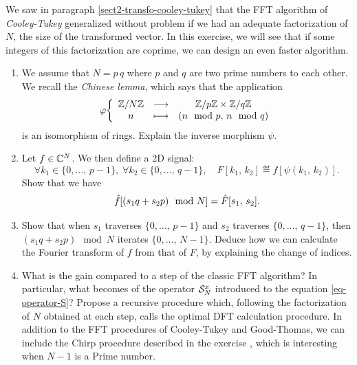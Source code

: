  
\begin{exo}
\label{exo-algo-good-thomas}
 
   We saw in paragraph \ref{sect2-transfo-cooley-tukey} that the FFT algorithm of \textit{Cooley-Tukey} generalized without problem if we had an adequate factorization of $N$, the size of the transformed vector. In this exercise, we will see that if some integers of this factorization are coprime, we can design an even faster algorithm. \begin{enumerate}
\item {}   We assume that $ N = p \, q $ where $ p $ and $ q $ are two prime numbers to each other. We recall the \textit{Chinese lemma}, which says that the application
\begin{equation*}
\varphi {\left\{ \begin{array}{ccc} \mathbb{Z}/N \mathbb{Z}& \longrightarrow & \mathbb{Z}/p \mathbb{Z}\times \mathbb{Z}/q \mathbb{Z}\\ n & \longmapsto & (n \mod p, \, n \mod q) \end{array} \right.}
\end{equation*}
is an isomorphism of rings. Explain the inverse morphism $ \psi $.
\item Let $ f \in \mathbb{C}^N $. We then define a 2D signal:
\begin{equation*}
\forall k_1 \in \{0, \ldots, \, p-1\}, \; \forall k_2 \in \{0, \ldots, \, q-1\}, \quad F [k_1, \, k_2] \eqdef f[\psi (k_1, \, k_2)].
\end{equation*}
Show that we have
\begin{equation*}
\hat{f}[(s_1 q + s_2 p) \mod N] = \hat{F}[s_1, \, s_2].
\end{equation*}
 
\item Show that when $ s_1 $ traverses $ \{0, \ldots, \, p-1\} $ and $ s_2 $ traverses $ \{0, \ldots, \, q-1\} $, then $ ( s_1 q + s_2 p) \mod N $ iterates $ \{0, \ldots, \, N-1\} $. Deduce how we can calculate the Fourier transform of $ f $ from that of $ F $, by explaining the change of indices.
\item What is the gain compared to a step of the classic FFT algorithm? In particular, what becomes of the operator $ \mathcal{S}_N^x $ introduced to the equation \eqref{eq-operator-S}? Propose a recursive procedure which, following the factorization of $N$ obtained at each step, calls the optimal DFT calculation procedure. In addition to the FFT procedures of Cooley-Tukey and Good-Thomas, we can include the Chirp procedure described in the exercise , which is interesting when $ N-1 $ is a Prime number.
\end{enumerate}
\end{exo}
 
